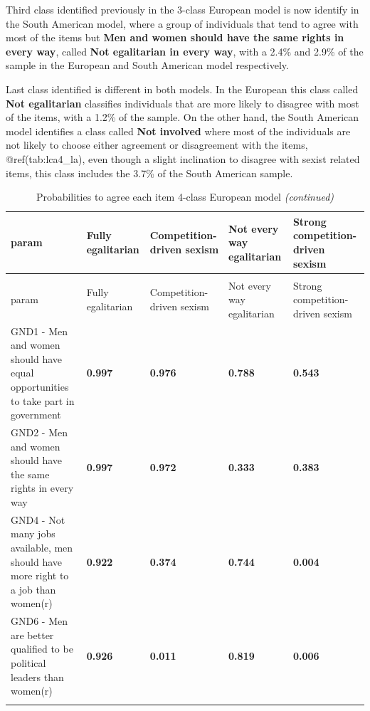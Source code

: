 \documentclass[12pt,twoside]{reedthesis}
\begin{document}
Third class identified previously in the 3-class European model is now identify in the South American model, where a group of individuals that tend to agree with most of the items but \textbf{Men and women should have the same rights in every way}, called \textbf{Not egalitarian in every way}, with a 2.4\% and 2.9\% of the sample in the European and South American model respectively.

Last class identified is different in both models. In the European this class called \textbf{Not egalitarian} classifies individuals that are more likely to disagree with most of the items, with a 1.2\% of the sample. On the other hand, the South American model identifies a class called \textbf{Not involved} where most of the individuals are not likely to choose either agreement or disagreement with the items, @ref(tab:lca4\_la), even though a slight inclination to disagree with sexist related items, this class includes the 3.7\% of the South American sample.

\begingroup\fontsize{9}{11}\selectfont
\begin{longtable}[l]{>{\raggedright\arraybackslash}p{20em}>{\raggedleft\arraybackslash}p{5em}>{\raggedleft\arraybackslash}p{5em}>{\raggedleft\arraybackslash}p{5em}>{\raggedleft\arraybackslash}p{5em}}
\caption{\label{tab:unnamed-chunk-23}Probabilities to agree each item 4-class European model \label{tab:lca4_eu}}\\
\toprule
param & Fully egalitarian & Competition- driven sexism & Not every way egalitarian & Strong competition- driven sexism\\
\midrule
\endfirsthead
\caption[]{\label{tab:unnamed-chunk-23}Probabilities to agree each item 4-class European model  \textit{(continued)}}\\
\toprule
param & Fully egalitarian & Competition- driven sexism & Not every way egalitarian & Strong competition- driven sexism\\
\midrule
\endhead

\endfoot
\bottomrule
\endlastfoot
GND1 - Men and women should have equal opportunities to take part in government & \textbf{\textcolor{Myblue}{0.997}} & \textbf{\textcolor{Myblue}{0.976}} & \textbf{\textcolor{Mygreen}{0.788}} & \textbf{\textcolor{Mygreen}{0.543}}\\
\cmidrule{1-5}\pagebreak[0]
GND2 - Men and women should have the same rights in every way & \textbf{\textcolor{Myblue}{0.997}} & \textbf{\textcolor{Myblue}{0.972}} & \textbf{\textcolor{Myred}{0.333}} & \textbf{\textcolor{Myred}{0.383}}\\
\cmidrule{1-5}\pagebreak[0]
GND4 - Not many jobs available, men should have more right to a job than women(r) & \textbf{\textcolor{Myblue}{0.922}} & \textbf{\textcolor{Myred}{0.374}} & \textbf{\textcolor{Mygreen}{0.744}} & \textbf{\textcolor{Myred}{0.004}}\\
\cmidrule{1-5}\pagebreak[0]
GND6 - Men are better qualified to be political leaders than women(r) & \textbf{\textcolor{Myblue}{0.926}} & \textbf{\textcolor{Myred}{0.011}} & \textbf{\textcolor{Myblue}{0.819}} & \textbf{\textcolor{Myred}{0.006}}\\*
\end{longtable}
\endgroup{}
\end{document}
